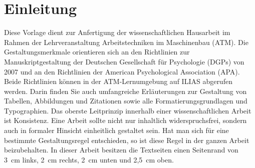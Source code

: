 \pagestyle{plain}
\chapter{Einleitung}

\noindent Diese Vorlage dient zur Anfertigung der wissenschaftlichen Hausarbeit im Rahmen der Lehrveranstaltung Arbeitstechniken im Maschinenbau (ATM). 
Die Gestaltungsmerkmale orientieren sich an den Richtlinien zur Manuskriptgestaltung der Deutschen Gesellschaft für Psychologie (DGPs) von 2007 und an den Richtlinien der American Psychological Association (APA). 
Beide Richtlinien können in der ATM-Lernumgebung auf ILIAS abgerufen werden. 
Darin finden Sie auch umfangreiche Erläuterungen zur Gestaltung von Tabellen, Abbildungen und Zitationen sowie alle Formatierungsgrundlagen und Typographien. 
Das oberste Leitprinzip innerhalb einer wissenschaftlichen Arbeit ist Konsistenz. 
Eine Arbeit sollte nicht nur inhaltlich widerspruchsfrei, sondern auch in formaler Hinsicht einheitlich gestaltet sein. 
Hat man sich für eine bestimmte Gestaltungsregel entschieden, so ist diese Regel in der ganzen Arbeit beizubehalten. 
In dieser Arbeit besitzen die Textseiten einen Seitenrand von 3~cm links, 2~cm rechts, 2~cm unten und 2,5~cm oben. 

